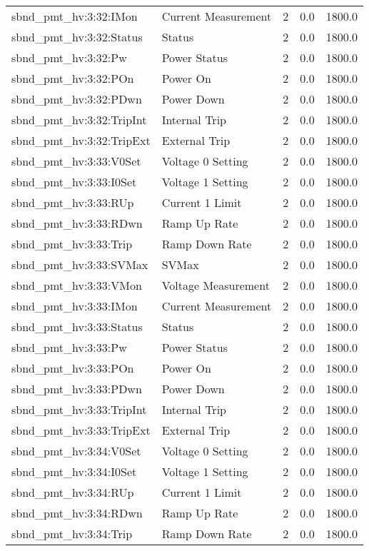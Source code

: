 \begin{center}
\begin{longtable}{l | l l l l }
sbnd\_pmt\_hv:3:32:IMon & Current Measurement & 2 & 0.0 & 1800.0\\ 
sbnd\_pmt\_hv:3:32:Status & Status & 2 & 0.0 & 1800.0\\ 
sbnd\_pmt\_hv:3:32:Pw & Power Status & 2 & 0.0 & 1800.0\\ 
sbnd\_pmt\_hv:3:32:POn & Power On & 2 & 0.0 & 1800.0\\ 
sbnd\_pmt\_hv:3:32:PDwn & Power Down & 2 & 0.0 & 1800.0\\ 
sbnd\_pmt\_hv:3:32:TripInt & Internal Trip & 2 & 0.0 & 1800.0\\ 
sbnd\_pmt\_hv:3:32:TripExt & External Trip & 2 & 0.0 & 1800.0\\ 
sbnd\_pmt\_hv:3:33:V0Set & Voltage 0 Setting & 2 & 0.0 & 1800.0\\ 
sbnd\_pmt\_hv:3:33:I0Set & Voltage 1 Setting & 2 & 0.0 & 1800.0\\ 
sbnd\_pmt\_hv:3:33:RUp & Current 1 Limit & 2 & 0.0 & 1800.0\\ 
sbnd\_pmt\_hv:3:33:RDwn & Ramp Up Rate & 2 & 0.0 & 1800.0\\ 
sbnd\_pmt\_hv:3:33:Trip & Ramp Down Rate & 2 & 0.0 & 1800.0\\ 
sbnd\_pmt\_hv:3:33:SVMax & SVMax & 2 & 0.0 & 1800.0\\ 
sbnd\_pmt\_hv:3:33:VMon & Voltage Measurement & 2 & 0.0 & 1800.0\\ 
sbnd\_pmt\_hv:3:33:IMon & Current Measurement & 2 & 0.0 & 1800.0\\ 
sbnd\_pmt\_hv:3:33:Status & Status & 2 & 0.0 & 1800.0\\ 
sbnd\_pmt\_hv:3:33:Pw & Power Status & 2 & 0.0 & 1800.0\\ 
sbnd\_pmt\_hv:3:33:POn & Power On & 2 & 0.0 & 1800.0\\ 
sbnd\_pmt\_hv:3:33:PDwn & Power Down & 2 & 0.0 & 1800.0\\ 
sbnd\_pmt\_hv:3:33:TripInt & Internal Trip & 2 & 0.0 & 1800.0\\ 
sbnd\_pmt\_hv:3:33:TripExt & External Trip & 2 & 0.0 & 1800.0\\ 
sbnd\_pmt\_hv:3:34:V0Set & Voltage 0 Setting & 2 & 0.0 & 1800.0\\ 
sbnd\_pmt\_hv:3:34:I0Set & Voltage 1 Setting & 2 & 0.0 & 1800.0\\ 
sbnd\_pmt\_hv:3:34:RUp & Current 1 Limit & 2 & 0.0 & 1800.0\\ 
sbnd\_pmt\_hv:3:34:RDwn & Ramp Up Rate & 2 & 0.0 & 1800.0\\ 
sbnd\_pmt\_hv:3:34:Trip & Ramp Down Rate & 2 & 0.0 & 1800.0\\ 

\end{longtable}
\end{center}
